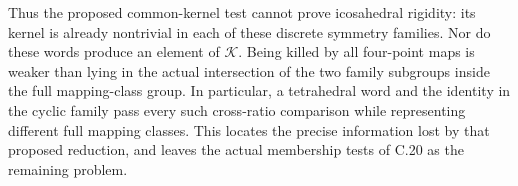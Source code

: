 Thus the proposed common-kernel test cannot prove icosahedral rigidity:
its kernel is already nontrivial in each of these discrete symmetry
families. Nor do these words produce an element of $\mathcal K$.
Being killed by all four-point maps is weaker than lying in the actual
intersection of the two family subgroups inside the full mapping-class
group. In particular, a tetrahedral word and the identity in the cyclic
family pass every such cross-ratio comparison while representing
different full mapping classes. This locates the precise information
lost by that proposed reduction, and leaves the actual membership tests
of C.20 as the remaining problem.
